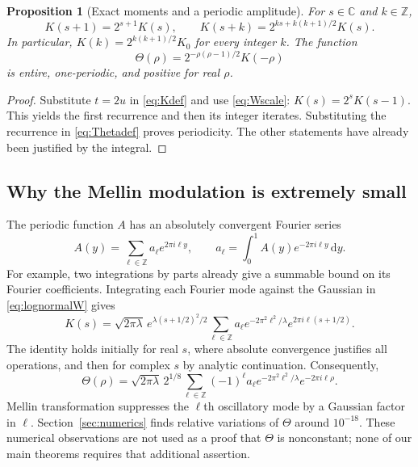 \documentclass[11pt,letterpaper]{article}
\numberwithin{equation}{section}
\newtheorem{proposition}[theorem]{Proposition}
\theoremstyle{definition}
\theoremstyle{remark}
\newcommand{\C}{\mathbb C}
\newcommand{\Z}{\mathbb Z}
\newcommand{\dd}{\,\mathrm d}
\begin{document}
\begin{proposition}[Exact moments and a periodic amplitude]\label{prop:K}
For $s\in\C$ and $k\in\Z$,
\begin{equation}\label{eq:Kshift}
 K(s+1)=2^{s+1}K(s),\qquad
 K(s+k)=2^{ks+k(k+1)/2}K(s).
\end{equation}
In particular, $K(k)=2^{k(k+1)/2}K_0$ for every integer $k$.
The function
\begin{equation}\label{eq:Thetadef}
 \Theta(\rho)=2^{-\rho(\rho-1)/2}K(-\rho)
\end{equation}
is entire, one-periodic, and positive for real $\rho$.
\end{proposition}
\begin{proof}
Substitute $t=2u$ in \eqref{eq:Kdef} and use \eqref{eq:Wscale}:
$K(s)=2^sK(s-1)$. This yields the first recurrence and then its integer
iterates. Substituting the recurrence in \eqref{eq:Thetadef} proves
periodicity. The other statements have already been justified by the
integral.
\end{proof}

\subsection{Why the Mellin modulation is extremely small}
The periodic function $A$ has an absolutely convergent Fourier series
\begin{equation}\label{eq:Afourier}
 A(y)=\sum_{\ell\in\Z}a_\ell e^{2\pi i\ell y},\qquad
 a_\ell=\int_0^1 A(y)e^{-2\pi i\ell y}\dd y.
\end{equation}
For example, two integrations by parts already give a summable bound on
its Fourier coefficients. Integrating each Fourier mode against the
Gaussian in \eqref{eq:lognormalW} gives
\begin{equation}\label{eq:Kfourier}
 K(s)=\sqrt{2\pi\lambda}\,
 e^{\lambda(s+1/2)^2/2}
 \sum_{\ell\in\Z}a_\ell
 e^{-2\pi^2\ell^2/\lambda}e^{2\pi i\ell(s+1/2)}.
\end{equation}
The identity holds initially for real $s$, where absolute convergence
justifies all operations, and then for complex $s$ by analytic continuation.
Consequently,
\begin{equation}\label{eq:Thetafourier}
 \Theta(\rho)=\sqrt{2\pi\lambda}\,2^{1/8}
 \sum_{\ell\in\Z}(-1)^\ell a_\ell
 e^{-2\pi^2\ell^2/\lambda}e^{-2\pi i\ell\rho}.
\end{equation}
Mellin transformation suppresses the $\ell$th oscillatory mode by a
Gaussian factor in $\ell$. Section~\ref{sec:numerics} finds relative
variations of $\Theta$ around $10^{-18}$. These numerical observations are
not used as a proof that $\Theta$ is nonconstant; none of our main theorems
requires that additional assertion.
\end{document}
